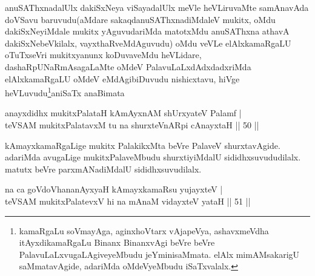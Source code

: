 \begin{artha}
anuSAThxnadalUlx dakiSxNeya viSayadalUlx meVle heVLiruvaMte samAnavAda doVSavu baruvudu(aMdare sakaqdanuSAThxnadiMdaleV mukitx, oMdu dakiSxNeyiMdale mukitx yAguvudariMda matotxMdu anuSAThxna athavA dakiSxNebeVkilalx, vayxthaRveMdAguvudu) oMdu veVLe elAlxkamaRgaLU oTuTxseVri mukitxyanunx koDuvaveMdu heVLidare, dashaRpUNaRmAsagaLaMte oMdeV PalavuLaLxdAdxdadxriMda elAlx\break kamaRgaLU oMdeV eMdAgibiDuvudu nishicxtavu, hiVge heVLuvudu\footnote{kamaRgaLu soVmayAga, aginxhoVtarx vAjapeVya, ashavxmeVdha itAyxdikamaRgaLu Binanx BinanxvAgi beVre beVre PalavuLaLxvugaLAgiveyeMbudu jeYminisaMmata. elAlx mimAMsakarigU saMmatavAgide, adariMda oMdeVyeMbudu iSaTxvalalx.}\break aniSaTx anaBimata   
\end{artha}


\begin{shl}
anayxdidhx mukitxPalataH kAmAyxnAM shUrxyateV Palamf |\\
teVSAM mukitxPalatavxM tu na shurxteVnARpi cAnayxtaH \hfill || 50 ||
\end{shl}

\begin{artha}
kAmayxkamaRgaLige mukitx PalakikxMta beVre PalaveV shurxtavAgide. adariMda avugaLige mukitxPalaveMbudu shurxtiyiMdalU sididhxsuvududilalx. matutx beVre parxmANadiMdalU sididhxsuvudilalx.
\end{artha}

\begin{shl}
na ca \footnotemark{}goVdoVhananAyxyaH kAmayxkamaRsu yujayxteV |\\
teVSAM mukitxPalatevxV hi na mAnaM vidayxteV yataH \hfill || 51 ||
\end{shl}

